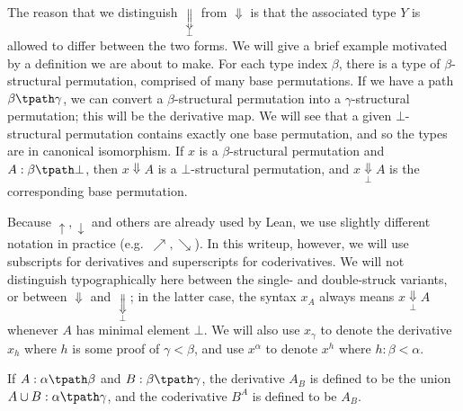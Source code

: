 The reason that we distinguish \( \underset{\bot}{\Downarrow} \) from \( \Downarrow \) is that the associated type \( Y \) is allowed to differ between the two forms.
We will give a brief example motivated by a definition we are about to make.
For each type index \( \beta \), there is a type of \( \beta \)-structural permutation, comprised of many base permutations.
If we have a path \( \beta \tpath \gamma \), we can convert a \( \beta \)-structural permutation into a \( \gamma \)-structural permutation; this will be the derivative map.
We will see that a given \( \bot \)-structural permutation contains exactly one base permutation, and so the types are in canonical isomorphism.
If \( x \) is a \( \beta \)-structural permutation and \( A : \beta \tpath \bot \), then \( x \Downarrow A \) is a \( \bot \)-structural permutation, and \( x \underset{\bot}{\Downarrow} A \) is the corresponding base permutation.

Because \( \uparrow, \downarrow \) and others are already used by Lean, we use slightly different notation in practice (e.g.\ \( \nearrow, \searrow \)).
In this writeup, however, we will use subscripts for derivatives and superscripts for coderivatives.
We will not distinguish typographically here between the single- and double-struck variants, or between \( \Downarrow \) and \( \underset{\bot}{\Downarrow} \); in the latter case, the syntax \( x_A \) always means \( x \underset{\bot}{\Downarrow} A \) whenever \( A \) has minimal element \( \bot \).
We will also use \( x_\gamma \) to denote the derivative \( x_h \) where \( h \) is some proof of \( \gamma < \beta \), and use \( x^\alpha \) to denote \( x^h \) where \( h : \beta < \alpha \).

\begin{definition-no-bp}
  If \( A : \alpha \tpath \beta \) and \( B : \beta \tpath \gamma \), the derivative \( A_B \) is defined to be the union \( A \cup B : \alpha \tpath \gamma \), and the coderivative \( B^A \) is defined to be \( A_B \).
\end{definition-no-bp}

